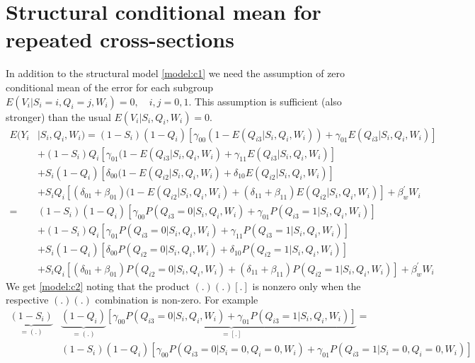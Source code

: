 \documentclass[12pt]{article}
\begin{document}
\section{Structural conditional mean for repeated cross-sections} \label{appendix:cross:cond}
In addition to the structural model \ref{model:c1} we need the assumption of zero conditional mean of the error for each subgroup $E(V_{i}|S_{i}=i,Q_{i}=j,W_{i})=0, \quad i,j=0,1$. This assumption is sufficient (also stronger) than the usual $E(V_{i}|S_{i},Q_{i},W_{i})=0$.
\begin{align*}
E(Y_i& |S_i,Q_i,W_i) = (1-S_i)(1-Q_{i})[\gamma_{00}(1-E(Q_{i3}|S_i,Q_i,W_i)) + \gamma_{01}E(Q_{i3}|S_i,Q_i,W_i)]\\
& +(1-S_i)Q_{i}[\gamma_{01}(1-E(Q_{i3}|S_i,Q_i,W_i)+\gamma_{11}E(Q_{i3}|S_i,Q_i,W_i)]\\
& + S_i(1-Q_{i})[\delta_{00}(1-E(Q_{i2}|S_i,Q_i,W_i)+\delta_{10}E(Q_{i2}|S_i,Q_i,W_i)]\\
& + S_iQ_{i}[(\delta_{01}+\beta_{01})(1-E(Q_{i2}|S_i,Q_i,W_i)+(\delta_{11}+\beta_{11})E(Q_{i2}|S_i,Q_i,W_i)] + \beta_w^\prime W_{i}\\
= & (1-S_i)(1-Q_{i})[\gamma_{00}P(Q_{i3}=0|S_i,Q_i,W_i)+\gamma_{01}P(Q_{i3}=1|S_i,Q_i,W_i)]\\
& +(1-S_i)Q_{i}[\gamma_{01}P(Q_{i3}=0|S_i,Q_i,W_i)+\gamma_{11}P(Q_{i3}=1|S_i,Q_i,W_i)]\\
& + S_i(1-Q_{i})[\delta_{00}P(Q_{i2}=0|S_i,Q_i,W_i)+\delta_{10}P(Q_{i2}=1|S_i,Q_i,W_i)]\\
& + S_iQ_{i}[(\delta_{01}+\beta_{01})P(Q_{i2}=0|S_i,Q_i,W_i)+(\delta_{11}+\beta_{11})P(Q_{i2}=1|S_i,Q_i,W_i)] + \beta_w^\prime W_{i}
\end{align*}
We get \ref{model:c2} noting that the product $(.)(.)[.]$ is nonzero only when the respective $(.)(.)$ combination is non-zero. For example
\begin{align*}
\underset{=(.)}{\underbrace{(1-S_i)}}&\underset{=(.)}{\underbrace{(1-Q_i)}}\underset{=[.]}{\underbrace{[\gamma_{00}P(Q_{i3}=0|S_i,Q_i,W_i)+\gamma_{01}P(Q_{i3}=1|S_i,Q_i,W_i)]}}= \\
 & (1-S_i)(1-Q_{i})[\gamma_{00}P(Q_{i3}=0|S_i=0,Q_i=0,W_i)+\gamma_{01}P(Q_{i3}=1|S_i=0,Q_i=0,W_i)]
\end{align*} 
\end{document}
